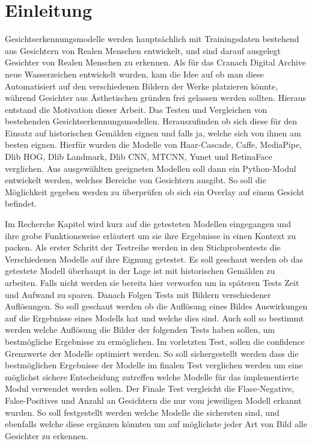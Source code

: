 \chapter{Einleitung}
%
Gesichtserkennungsmodelle werden hauptsächlich mit Trainingsdaten bestehend aus Gesichtern von Realen Menschen entwickelt, und sind darauf ausgelegt Gesichter von Realen Menschen zu erkennen. Als für das Cranach Digital Archive neue Wasserzeichen entwickelt wurden, kam die Idee auf ob man diese Automatisiert auf den verschiedenen Bildern der Werke platzieren könnte, während Gesichter aus Ästhetischen gründen frei gelassen werden sollten. Hieraus entstand die Motivation dieser Arbeit. Das Testen und Vergleichen von bestehenden Gesichtserkennungsmodellen. Herauszufinden ob sich diese für den Einsatz auf historischen Gemälden eignen und falls ja, welche sich von ihnen am besten eignen. Hierfür wurden die Modelle von Haar-Cascade, Caffe, MediaPipe, Dlib HOG, Dlib Landmark, Dlib CNN, MTCNN, Yunet und RetinaFace verglichen. Aus ausgewählten geeigneten Modellen soll dann ein Python-Modul entwickelt werden, welches Bereiche von Gesichtern ausgibt. So soll die Möglichkeit gegeben werden zu überprüfen ob sich ein Overlay auf einem Gesicht befindet.

Im Recherche Kapitel wird kurz auf die getesteten Modellen eingegangen und ihre grobe Funktionsweise erläutert um sie ihre Ergebnisse in einen Kontext zu packen.
Als erster Schritt der Testreihe werden in den Stichprobentests die Verschiedenen Modelle auf ihre Eignung getestet. Es soll geschaut werden ob das getestete Modell überhaupt in der Lage ist mit historischen Gemälden zu arbeiten. Falls nicht werden sie bereits hier verworfen um in späteren Tests Zeit und Aufwand zu sparen.
Danach Folgen Tests mit Bildern verschiedener Auflösungen. So soll geschaut werden ob die Auflösung eines Bildes Auswirkungen auf die Ergebnisse eines Modells hat und welche dies sind. Auch soll so bestimmt werden welche Auflösung die Bilder der folgenden Tests haben sollen, um bestmögliche Ergebnisse zu ermöglichen.
Im vorletzten Test, sollen die confidence Grenzwerte der Modelle optimiert werden. So soll sichergestellt werden dass die bestmöglichen Ergebnisse der Modelle im finalen Test verglichen werden um eine möglichst sichere Entscheidung zutreffen welche Modelle für das implementierte Modul verwendet werden sollen.
Der Finale Test vergleicht die Flase-Negative, False-Positives und Anzahl an Gesichtern die nur vom jeweiligen Modell erkannt wurden. So soll festgestellt werden welche Modelle die sichersten sind, und ebenfalls welche diese ergänzen könnten um auf möglichste jeder Art von Bild alle Gesichter zu erkennen.